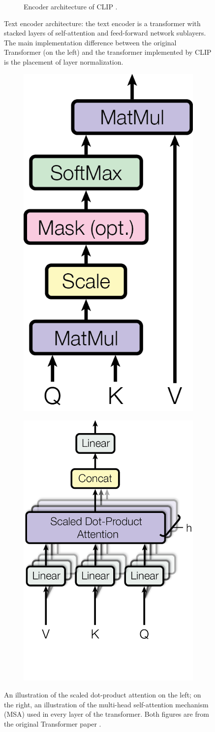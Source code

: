 \begin{figure}[!h]
\begin{subfigure}{0.5\textwidth}
    \caption{Encoder architecture of CLIP \citep{CLIPpaper}.}
    \label{modeling.attention.clipEncoder}
\end{subfigure}
\caption{Text encoder architecture: the text encoder is a transformer with stacked layers of self-attention and feed-forward network sublayers. The main implementation difference between the original Transformer (on the left) and the transformer implemented by CLIP is the placement of layer normalization.}
\label{modeling.transformer}
\end{figure}

\begin{figure}[h!]
\begin{subfigure}{0.5\textwidth}
\centering
\includegraphics[width=.3\linewidth]{modeling/selfAttention.png}  
\end{subfigure}
\begin{subfigure}{0.5\textwidth}
\centering
\includegraphics[width=.5\linewidth]{modeling/multiHeadAttention.png}  
\end{subfigure}
\caption{An illustration of the scaled dot-product attention on the left; on the right, an illustration of the multi-head self-attention mechanism (MSA) used in every layer of the transformer. Both figures are from the original Transformer paper \citep{attentionAllYouNeed}.}
\label{modeling.attention}
\end{figure}

